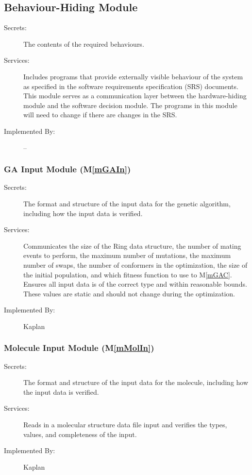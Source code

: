 \documentclass[12pt, titlepage]{article}
\newcommand{\mref}[1]{M\ref{#1}}
\newcommand{\progname}{Kaplan} %
\begin{document}
\subsection{Behaviour-Hiding Module}

\begin{description}
\item[Secrets:]The contents of the required behaviours.
\item[Services:]Includes programs that provide externally visible behaviour of
  the system as specified in the software requirements specification (SRS)
  documents. This module serves as a communication layer between the
  hardware-hiding module and the software decision module. The programs in this
  module will need to change if there are changes in the SRS.
\item[Implemented By:] --
\end{description}

\subsubsection{GA Input Module (\mref{mGAIn})}

\begin{description}
\item[Secrets:]The format and structure of the input data for the genetic 
algorithm, including how the input data is verified.
\item[Services:] Communicates the size of the Ring data structure, the number 
of mating events to perform, the maximum number of mutations, the maximum 
number of swaps, the number of conformers in the optimization, the size of the 
initial population, and which fitness function to use to \mref{mGAC}. Ensures 
all input data is of the correct type and within reasonable 
bounds. These values are static and should not change during the optimization.
\item[Implemented By:] \progname{}
\end{description}

\subsubsection{Molecule Input Module (\mref{mMolIn})}
\begin{description}
	\item[Secrets:] The format and structure of the input data for the 
	molecule, including how the input data is verified.
	\item[Services:] Reads in a molecular structure data file input and 
	verifies the types, values, and completeness of the input.
	\item[Implemented By:] \progname{}
\end{description}
\end{document}

